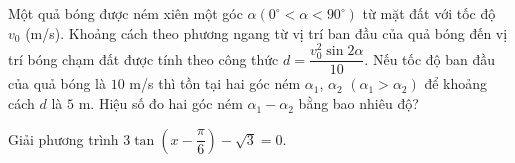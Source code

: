 \begin{bt}%
	Một quả bóng được ném xiên một góc $\alpha\left(0^{\circ} < \alpha < 90^{\circ}\right)$ từ mặt đất với tốc độ $v_0$ (m/s). Khoảng cách theo phương ngang từ vị trí ban đầu của quả bóng đến vị trí bóng chạm đất được tính theo công thức $d=\dfrac{v_0^2\sin 2\alpha}{10}$. Nếu tốc độ ban đầu của quả bóng là $10$ m/s thì tồn tại hai góc ném $\alpha_1$, $\alpha_2$ $\left(\alpha_1 > \alpha_2\right)$ để khoảng cách $d$ là $5$ m. Hiệu số đo hai góc ném $\alpha_1-\alpha_2$ bằng bao nhiêu độ?
\end{bt}

\begin{bt}%
	Giải phương trình $ 3\tan \left(x-\dfrac{\pi}{6}\right)-\sqrt 3=0$.
\end{bt}

